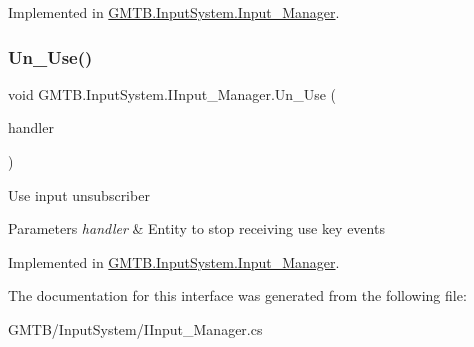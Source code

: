 Implemented in \mbox{\hyperlink{class_g_m_t_b_1_1_input_system_1_1_input___manager_a6d9a4033204bd3c03faa7e86c67e0ed2}{G\+M\+T\+B.\+Input\+System.\+Input\+\_\+\+Manager}}.

\mbox{\label{interface_g_m_t_b_1_1_input_system_1_1_i_input___manager_a1e9eb281683c7a6b7aa1a73da1853941}} 
\subsubsection{\texorpdfstring{Un\_Use()}{Un\_Use()}}
{\footnotesize\ttfamily void G\+M\+T\+B.\+Input\+System.\+I\+Input\+\_\+\+Manager.\+Un\+\_\+\+Use (\begin{DoxyParamCaption}\item[{Event\+Handler$<$ \mbox{\hyperlink{class_g_m_t_b_1_1_input_system_1_1_input_event}{Input\+Event}} $>$}]{handler }\end{DoxyParamCaption})}



Use input unsubscriber 


\begin{DoxyParams}{Parameters}
{\em handler} & Entity to stop receiving use key events\\
\hline
\end{DoxyParams}


Implemented in \mbox{\hyperlink{class_g_m_t_b_1_1_input_system_1_1_input___manager_a176df04c04e24ecb9577789c0ff03696}{G\+M\+T\+B.\+Input\+System.\+Input\+\_\+\+Manager}}.



The documentation for this interface was generated from the following file\+:\begin{DoxyCompactItemize}
\item 
G\+M\+T\+B/\+Input\+System/I\+Input\+\_\+\+Manager.\+cs\end{DoxyCompactItemize}
